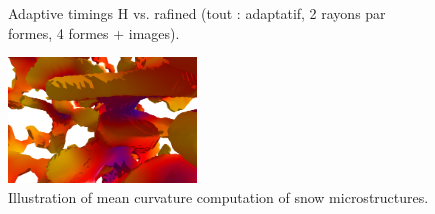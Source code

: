 \documentclass{llncs}
\begin{document}
\begin{figure}[!htbp]
\begin{center}
\begin{tikzpicture}[scale=0.7]
     \end{tikzpicture}
     \end{center}
  \caption{Adaptive timings H vs. rafined (tout : adaptatif, 2 rayons par formes, 4
    formes + images).}
  \label{fig:timings}
\end{figure}

\begin{figure}
  \begin{center}
   \includegraphics[width=5cm]{figs/snow_I08iso_233_r20_l0_m3}

  \end{center}
  \caption{Illustration of mean curvature computation of snow microstructures.}
  \label{fig:full}
\end{figure}
\end{document}
